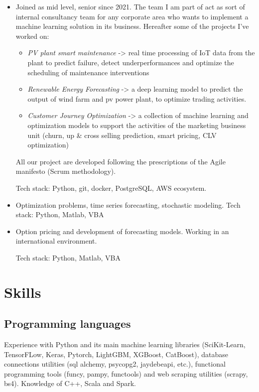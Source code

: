 \documentclass[11pt,a4paper,sans]{moderncv}        %
\begin{document}
\begin{itemize}
\item{
Joined as mid level, senior since 2021. The team I am part of act as sort of internal consultancy team for any corporate area who wants to implement a machine learning solution in its business. Hereafter some of the projects I've worked on:
\smallskip
\begin{itemize}
\item{\emph{PV plant smart maintenance} -> real time processing of IoT data from the plant to predict failure, detect underperformances and optimize the scheduling of maintenance interventions}
\item{\emph{Renewable Energy Forecasting} -> a deep learning model to predict the output of wind farm and pv power plant, to optimize trading activities.}
\item{\emph{Customer Journey Optimization} -> a collection of machine learning and optimization models to support the activities of the marketing business unit (churn, up \& cross selling prediction, smart pricing, CLV optimization)}
\end{itemize} 
\smallskip
All our project are developed following the prescriptions of the Agile manifesto (Scrum methodology). 

Tech stack: Python, git, docker, PostgreSQL, AWS ecosystem.}
\item{
Optimization problems, time series forecasting, stochastic modeling. Tech stack: Python, Matlab, VBA}
\item{
Option pricing and development of forecasting models. Working in an international environment.

Tech stack: Python, Matlab, VBA}
\end{itemize}

\section{Skills}
\subsection{Programming languages}
Experience with Python and its main machine learning libraries (SciKit-Learn, TensorFLow, Keras, Pytorch, LightGBM, XGBoost, CatBoost), database connections utilities (sql alchemy, psycopg2, jaydebeapi, etc.), functional programming tools (funcy, pampy, functools) and web scraping utilities (scrapy, bs4). Knowledge of C++, Scala and Spark.
\end{document}
